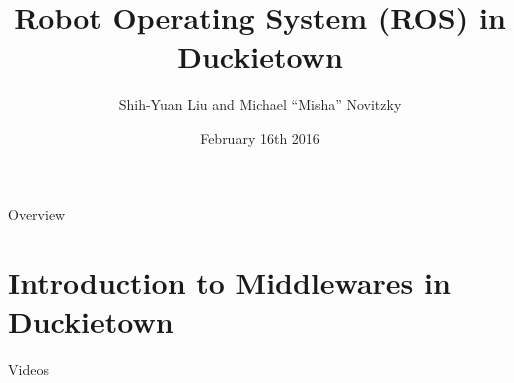 \documentclass[aspectratio=43]{beamer}
\author[S.-Y.Liu, M. Novitzky]{Shih-Yuan Liu and Michael ``Misha'' Novitzky}
\title[ROS in Duckietown]{Robot Operating System (ROS) in Duckietown}
\institute[Duckietown MIT]{Duckietown, MIT}
\date[Feb. 16th, 2016]{February 16th 2016}
\begin{document}

\begin{frame}[plain,label=titlepage,noframenumbering] %
	\titlepage
\end{frame}

\begin{frame}[label=overview]{Overview}
	\tableofcontents
\end{frame}

\section{Introduction to Middlewares in Duckietown}


\begin{frame}{Videos}
\begin{center}
\end{center}
\end{frame}

\end{document}
